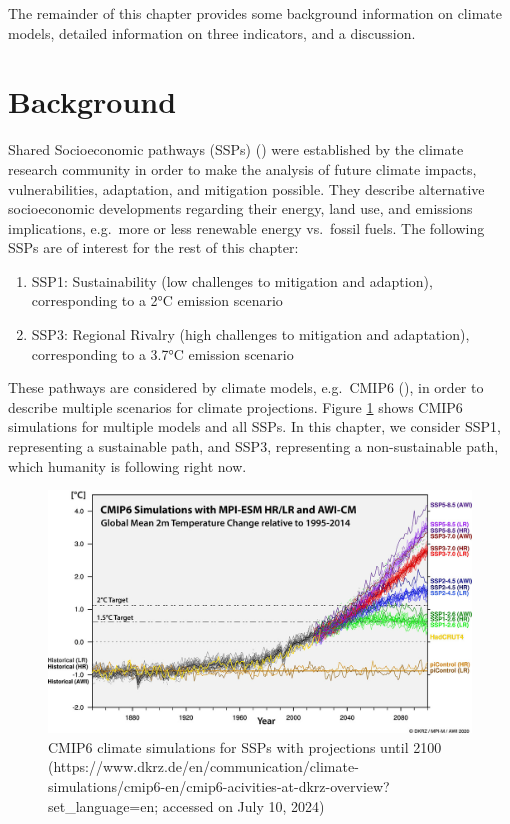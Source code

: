 \documentclass[
]{krantz}
\providecommand{\tightlist}{%
  \setlength{\itemsep}{0pt}\setlength{\parskip}{0pt}}
\begin{document}
The remainder of this chapter provides some background information on climate models, detailed information on three indicators, and a discussion.

\section{Background}\label{background}

Shared Socioeconomic pathways (SSPs) (\citet{RIAHI2017153}) were established by the climate research community in order to make the analysis of future climate impacts, vulnerabilities, adaptation, and mitigation possible. They describe alternative socioeconomic developments regarding their energy, land use, and emissions implications, e.g.~more or less renewable energy vs.~fossil fuels. The following SSPs are of interest for the rest of this chapter:

\begin{enumerate}
\tightlist
\item
  SSP1: Sustainability (low challenges to mitigation and adaption), corresponding to a 2°C emission scenario
\item
  SSP3: Regional Rivalry (high challenges to mitigation and adaptation), corresponding to a 3.7°C emission scenario
\end{enumerate}

These pathways are considered by climate models, e.g.~CMIP6 (\citet{gmd-9-1937-2016}), in order to describe multiple scenarios for climate projections. Figure \ref{fig:cmip6strobl} shows CMIP6 simulations for multiple models and all SSPs. In this chapter, we consider SSP1, representing a sustainable path, and SSP3, representing a non-sustainable path, which humanity is following right now.

\begin{figure}
\includegraphics[width=1\linewidth]{work/08-lancet/figures/cmip6} \caption{CMIP6 climate simulations for SSPs with projections until 2100 (https://www.dkrz.de/en/communication/climate-simulations/cmip6-en/cmip6-acivities-at-dkrz-overview?set\_language=en; accessed on July 10, 2024)}\label{fig:cmip6strobl}
\end{figure}
\end{document}
